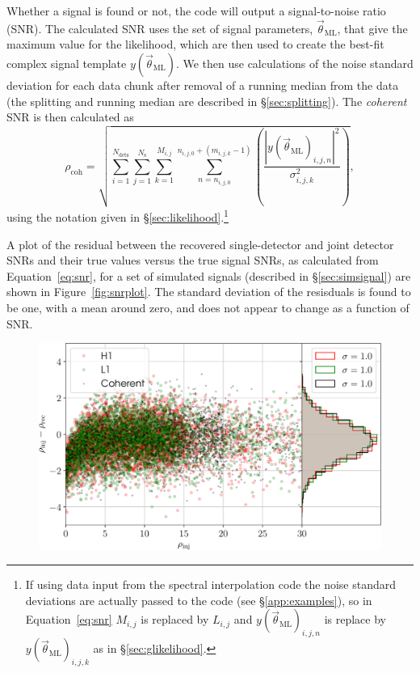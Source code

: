 Whether a signal is found or not, the code will output a signal-to-noise ratio (SNR). The calculated SNR uses the set of signal
parameters, $\vec{\theta}_{\text{ML}}$, that give the maximum value for the likelihood, which are then used to create the best-fit
complex signal template $y(\vec{\theta}_{\text{ML}})$. We then use calculations of the
noise standard deviation for each data chunk after removal of a running median from the data (the splitting and running median are
described in \S\ref{sec:splitting}). The {\it coherent} SNR is then calculated as
\begin{equation}\label{eq:snr}
 \rho_{\text{coh}} = \sqrt{\sum_{i=1}^{N_{\text{dets}}} \sum_{j=1}^{N_{\text{s}}}
\sum_{k=1}^{M_{i,j}} \sum_{n=n_{i,j,0}}^{n_{i,j,0}+(m_{i,j,k}-1)}\left(\frac{|y(\vec{\theta}_{\text{ML}})_{i,j,n}|^2}{\sigma_{i,j,k}^2}\right)},
\end{equation}
using the notation given in \S\ref{sec:likelihood}.\footnote{If using data input from the spectral interpolation code \citep{2017CQGra..34a5010D}
the noise standard deviations are actually passed to the code (see \S\ref{app:examples}), so in Equation~\ref{eq:snr} $M_{i,j}$ is replaced
by $L_{i,j}$ and $y(\vec{\theta}_{\text{ML}})_{i,j,n}$ is replace by $y(\vec{\theta}_{\text{ML}})_{i,j,k}$ as in \S\ref{sec:glikelihood}.}

A plot of the residual between the recovered single-detector and joint detector SNRs and their true values versus the true signal SNRs,
as calculated from Equation~\ref{eq:snr}, for a set of simulated signals (described in \S\ref{sec:simsignal}) are shown in Figure~\ref{fig:snrplot}.
The standard deviation of the resisduals is found to be one, with a mean around zero, and does not appear to change as a function of SNR.

\begin{figure}[!phtb]
\begin{center}
\includegraphics[width=1\columnwidth]{./figures/codeeval/stats/snrs/snr_plot}
\caption{ \protect}
\end{center}
\end{figure}

